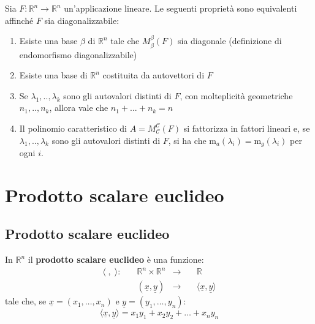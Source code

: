 \documentclass[
  a4paper,
]{article}
\providecommand{\tightlist}{%
  \setlength{\itemsep}{0pt}\setlength{\parskip}{0pt}}
\providecommand{\tightlist}{}
\begin{document}
\begin{propositionbox}
Sia \(F : \mathbb{R}^n \to \mathbb{R}^n\) un'applicazione lineare. Le
seguenti proprietà sono equivalenti affinché \(F\) sia diagonalizzabile:

\begin{enumerate}
\def\labelenumi{\arabic{enumi}.}
\tightlist
\item
  Esiste una base \(\beta\) di \(\mathbb{R}^n\) tale che
  \(M^{{\beta}}_{\beta}(F)\) sia diagonale (definizione di endomorfismo
  diagonalizzabile)
\item
  Esiste una base di \(\mathbb{R}^n\) costituita da autovettori di \(F\)
\item
  Se \(\lambda_1, .., \lambda_k\) sono gli autovalori distinti di \(F\),
  con molteplicità geometriche \(n_1, .., n_k\), allora vale che
  \(n_1 + ... + n_k = n\)
\item
  Il polinomio caratteristico di
  \(A = M^{{\mathcal{C}}}_{\mathcal{C}}(F)\) si fattorizza in fattori
  lineari e, se \(\lambda_1, .., \lambda_k\) sono gli autovalori
  distinti di \(F\), si ha che
  \(\text{m}_a(\lambda_i) = \text{m}_g(\lambda_i)\) per ogni \(i\).
\end{enumerate}
\end{propositionbox}

\newpage

\hypertarget{prodotto-scalare-euclideo}{%
\section{Prodotto scalare euclideo}\label{prodotto-scalare-euclideo}}

\hypertarget{prodotto-scalare-euclideo-1}{%
\subsection{Prodotto scalare
euclideo}\label{prodotto-scalare-euclideo-1}}

\begin{definitionbox}
In \(\mathbb{R}^n\) il \textbf{prodotto scalare euclideo} è una
funzione: \[
\begin{aligned}
\langle \; , \; \rangle: \quad &\mathbb{R}^n \times \mathbb{R}^n &\to& \quad \mathbb{R} \\
&(\underline{x}, \underline{y}) &\to& \quad\langle \underline{x} , \underline{y} \rangle
\end{aligned}
\] tale che, se \(\underline{x} = (x_1, \dots, x_n)\) e
\(\underline{y} = (y_1, \dots, y_n)\): \[
\langle \underline{x} , \underline{y} \rangle = x_1y_1 + x_2y_2 + \dots + x_ny_n
\]
\end{definitionbox}
\end{document}

